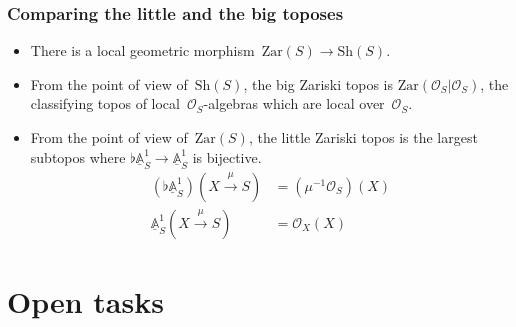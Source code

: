 \documentclass[12pt,utf8,notheorems,compress,t]{beamer}
\renewcommand{\AA}{\mathbb{A}}
\renewcommand{\O}{\mathcal{O}}
\newcommand{\Sh}{\mathrm{Sh}}
\newcommand{\Zar}{\mathrm{Zar}}
\renewcommand{\_}{\mathpunct{.}}
\newcommand{\?}{\,{:}\,}
\newcommand{\ull}[1]{\underline{#1}}
\newcommand{\affl}{\ensuremath{{\ull{\AA}^1_S}}}
\begin{document}
\begin{frame}\frametitle{Comparing the little and the big toposes}
  \begin{itemize}
  \item There is a local geometric morphism~$\Zar(S) \to \Sh(S)$.

  \item From the point of view of~$\Sh(S)$, the big Zariski topos is $\Zar(\O_S | \O_S)$,
  the classifying topos of local~$\O_S$-algebras which are local
  over~$\O_S$.

  \item From the point of view of~$\Zar(S)$, the little Zariski topos is the
  largest subtopos where $\flat \affl \to \affl$ is bijective.
  \begin{align*}
    (\flat \affl)(X \xrightarrow{\mu} S) &= (\mu^{-1} \O_S)(X) \\
    \affl(X \xrightarrow{\mu} S) &= \O_X(X)
  \end{align*}
  \end{itemize}
\end{frame}


\section{Open tasks}
\end{document}
